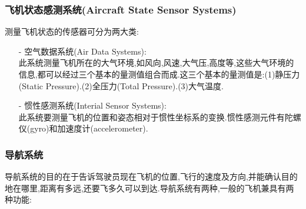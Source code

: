 \documentclass[9pt, oneside]{book}
\begin{document}
\subsubsection{飞机状态感测系统(Aircraft State Sensor Systems)}

测量飞机状态的传感器可分为两大类:

\begin{itemize}
    \item [-] 空气数据系统(Air Data Systems): \\
        此系统测量飞机所在的大气环境,如风向,风速,大气压,高度等,这些大气环境的信息,都可以经过三个基本的量测值组合而成.这三个基本的量测值是:(1)静压力(Static Pressure).(2)全压力(Total Pressure).(3)大气温度.
    \item [-] 惯性感测系统(Interial Sensor Systems): \\
        此系统要测量飞机的位置和姿态相对于惯性坐标系的变换.惯性感测元件有陀螺仪(gyro)和加速度计(accelerometer).
\end{itemize}

\subsubsection{导航系统}

导航系统的目的在于告诉驾驶员现在飞机的位置,飞行的速度及方向,并能确认目的地在哪里,距离有多远,还要飞多久可以到达.导航系统有两种,一般的飞机兼具有两种功能:
\end{document}
